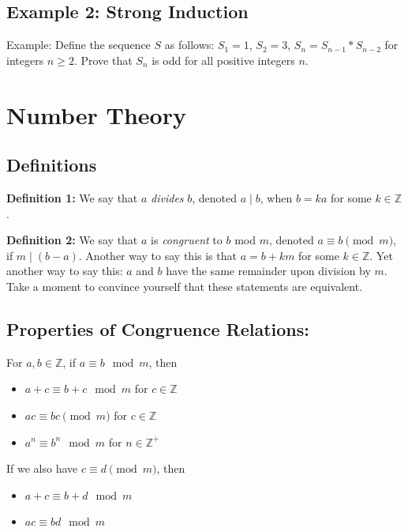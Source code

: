 \documentclass[12pt,letterpaper]{article}
\newcommand\Z{\mathbb Z}
\begin{document}
\subsection{Example 2: Strong Induction}
Example: Define the sequence $S$ as follows: $S_1 = 1$, $S_2 = 3$, $S_n = S_{n-1} * S_{n-2}$ for integers $n \geq 2$. Prove that $S_n$ is odd for all positive integers $n$.

\begin{mdframed}\vspace{4 cm}\end{mdframed}

\section{Number Theory}

\subsection{Definitions}

	\textbf{Definition 1:} We say that $a$ \textit{divides} $b$, denoted $a \mid b$, when $b = ka$ for some $k \in \Z$. 

	\textbf{Definition 2:} We say that $a$ is \textit{congruent} to $b$ mod $m$, denoted $a \equiv b \pmod m$, if $m \mid (b-a)$. Another way to say this is that $a = b + km$ for some $k \in \Z$. Yet another way to say this: $a$ and $b$ have the same remainder upon division by $m$. Take a moment to convince yourself that these statements are equivalent. 
	
	

\subsection{Properties of Congruence Relations:}

For $a,b \in \Z$, if $a \equiv b \mod{m}$, then
\begin{itemize}
    \item $a + c\equiv b + c\mod{m}$ for $c \in \mathbb{Z}$
    \item $ac \equiv bc \pmod{m}$ for $c \in \mathbb{Z}$
    \item $a^n \equiv b^n \mod{m}$ for $n \in \mathbb{Z^+}$
\end{itemize}
If we also have $c \equiv d \pmod{m}$, then
\begin{itemize}
    \item $a + c\equiv b + d\mod{m}$
    \item $ac\equiv bd\mod{m}$
\end{itemize}
\end{document}
